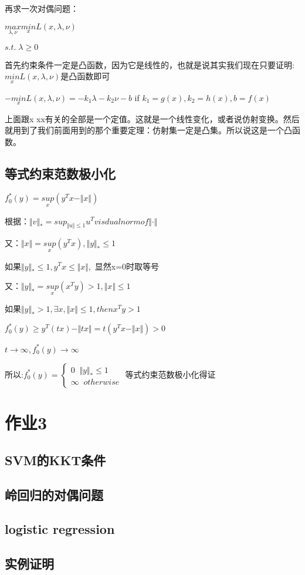 \documentclass[12pt, a4paper, oneside, fontset=windows]{ctexart}
\begin{document}
再求一次对偶问题：

$\underset{\lambda ,\nu }{max}\underset{x }{min}L\left ( x,\lambda ,\nu  \right )$

$s.t.\; \lambda \geq 0$

首先约束条件一定是凸函数，因为它是线性的，也就是说其实我们现在只要证明:$\underset{x }{min}L\left ( x,\lambda ,\nu  \right )$是凸函数即可

$-\underset{x }{min}L\left ( x,\lambda ,\nu  \right )=-k_{1}\lambda -k_{2}\nu -b$ if $k_{1}=g\left ( x \right ),k_{2}=h\left ( x \right ),b=f\left ( x \right )$

上面跟x xx有关的全部是一个定值。这就是一个线性变化，或者说仿射变换。然后就用到了我们前面用到的那个重要定理：仿射集一定是凸集。所以说这是一个凸函数。

\subsection{等式约束范数极小化}
$f_{0}^{*}\left ( y \right )=\underset{x}{sup}\left ( y^{T} x -\Vert x \Vert\right )$

根据：$\Vert v \Vert_{*}=sup_{\Vert u \Vert\leq 1}u^{T}v is dual norm of \Vert \cdot  \Vert$

又：$\Vert x \Vert=\underset{x}{sup}\left ( y^{T} x \right ),\Vert y  \Vert_{*}\leq 1$

如果$\Vert y  \Vert_{*}\leq 1,  y^{T} x \leq \Vert x  \Vert ,$ 显然x=0时取等号

又：$\Vert y \Vert_{*}=\underset{x}{sup}\left ( x^{T} y \right )> 1,\Vert x  \Vert\leq 1$

如果$\Vert y  \Vert_{*}> 1,  \exists x , \Vert x \Vert \leq 1,then x^{T}y>1$

$f_{0}^{*}\left ( y \right )\geq y^{T}\left ( tx \right )-\Vert tx  \Vert=t\left ( y^{T}x-\Vert x  \Vert \right )> 0$

$t\rightarrow \infty, f_{0}^{*}\left ( y \right )\rightarrow \infty$

所以:$f_{0}^{*}\left ( y \right )=\left\{\begin{matrix}
    0\; \;\Vert y \Vert_{*}\leq 1 \\ 
    \infty\; \; otherwise
    \end{matrix}\right.$
等式约束范数极小化得证
\section{作业3}

\subsection{SVM的KKT条件}

\subsection{岭回归的对偶问题}

\subsection{logistic regression}

\subsection{实例证明}
\end{document}
